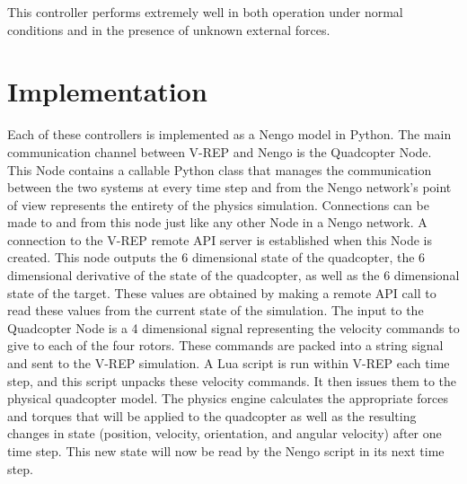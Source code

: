 \documentclass[letterpaper,12pt,titlepage,oneside,final]{book}
\begin{document}
This controller performs extremely well in both operation under normal conditions and in the presence of unknown external forces.


\section{Implementation}


Each of these controllers is implemented as a Nengo model in Python. 
The main communication channel between V-REP and Nengo is the Quadcopter Node. 
This Node contains a callable Python class that manages the communication between the two systems at every time step and from the Nengo network’s point of view represents the entirety of the physics simulation. 
Connections can be made to and from this node just like any other Node in a Nengo network. 
A connection to the V-REP remote API server is established when this Node is created. 
This node outputs the 6 dimensional state of the quadcopter, the 6 dimensional derivative of the state of the quadcopter, as well as the 6 dimensional state of the target. 
These values are obtained by making a remote API call to read these values from the current state of the simulation. The input to the Quadcopter Node is a 4 dimensional signal representing the velocity commands to give to each of the four rotors. 
These commands are packed into a string signal and sent to the V-REP simulation. 
A Lua script is run within V-REP each time step, and this script unpacks these velocity commands. 
It then issues them to the physical quadcopter model. The physics engine calculates the appropriate forces and torques that will be applied to the quadcopter as well as the resulting changes in state (position, velocity, orientation, and angular velocity) after one time step. 
This new state will now be read by the Nengo script in its next time step.
\end{document}
